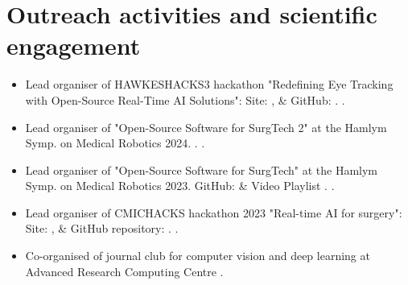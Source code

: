 \documentclass{mycv}
\begin{document}
\section{Outreach activities and scientific engagement}
\begin{itemize}

\item Lead organiser of HAWKESHACKS3 hackathon "Redefining Eye Tracking with Open-Source Real-Time AI Solutions":
	Site: \href{https://cmic-ucl.github.io/CMICHACKS/}{\faExternalLink*}, \&
	GitHub: \href{https://github.com/oocular/ready/tree/main/docs/hackathons/hawkes2024}{\faGithub*}.
	.

\item Lead organiser of "Open-Source Software for SurgTech 2" at the Hamlym Symp. on Medical Robotics 2024.
	\href{https://www.hamlynsymposium.org/events/open-source-software-for-surgical-technologies-2/}{\faExternalLink*}.
	.

\item Lead organiser of "Open-Source Software for SurgTech" at the Hamlym Symp. on Medical Robotics 2023. 
	GitHub: \href{https://github.com/oss-for-surgtech/workshop-hamlyn2023}{\faGithub*} \&
    Video Playlist \href{https://youtube.com/playlist?list=PLtGJkyfu0klZlvZkPyDLArhjs7i39C-ld&si=wmOQZ2Qr5_QDWrg3}{\faYoutube}.
	.

\item Lead organiser of CMICHACKS hackathon 2023 "Real-time AI for surgery": 
	Site: \href{https://cmic-ucl.github.io/CMICHACKS/edition2023/index.html}{\faExternalLink*}, \&
	GitHub repository: \href{https://github.com/SciKit-Surgery/cmicHACKS2}{\faGithub*}.
	.

\item Co-organised of journal club for computer vision and deep learning at Advanced Research Computing Centre 
	.


\end{itemize}
\end{document}
